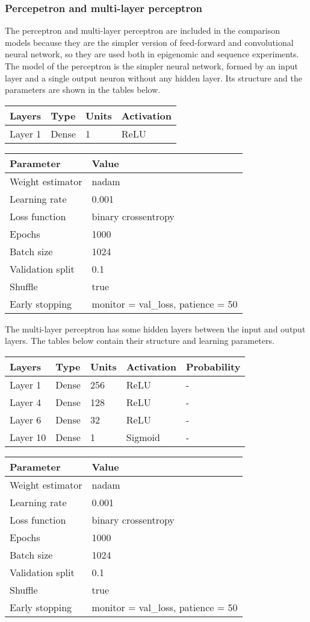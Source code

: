 \newpage
\subsubsection{Percepetron and multi-layer
perceptron}\label{header-n820}

The perceptron and multi-layer perceptron are included in the comparison
models because they are the simpler version of feed-forward and
convolutional neural network, so they are used both in epigenomic and
sequence experiments. The model of the perceptron is the simpler neural
network, formed by an input layer and a single output neuron without any
hidden layer. Its structure and the parameters are shown in the tables
below.

\begin{longtable}[]{@{}llll@{}}
\toprule
\textbf{Layers} & \textbf{Type} & \textbf{Units} & \textbf{Activation}\tabularnewline
\midrule
\endhead
Layer 1 & Dense & 1 & ReLU\tabularnewline
\bottomrule
\end{longtable}

\begin{longtable}[]{@{}ll@{}}
\toprule
\textbf{Parameter} & \textbf{Value}\tabularnewline
\midrule
\endhead
Weight estimator & nadam\tabularnewline
Learning rate & 0.001\tabularnewline
Loss function & binary crossentropy\tabularnewline
Epochs & 1000\tabularnewline
Batch size & 1024\tabularnewline
Validation split & 0.1\tabularnewline
Shuffle & true\tabularnewline
Early stopping & monitor = val\_loss, patience = 50\tabularnewline
\bottomrule
\end{longtable}

The multi-layer perceptron has some hidden layers between the input and
output layers. The tables below contain their structure and learning
parameters.

\begin{longtable}[]{@{}lllll@{}}
\toprule
\textbf{Layers} & \textbf{Type} & \textbf{Units} & \textbf{Activation} & \textbf{Probability}\tabularnewline
\midrule
\endhead
Layer 1 & Dense & 256 & ReLU & -\tabularnewline
Layer 4 & Dense & 128 & ReLU & -\tabularnewline
Layer 6 & Dense & 32 & ReLU & -\tabularnewline
Layer 10 & Dense & 1 & Sigmoid & -\tabularnewline
\bottomrule
\end{longtable}

\begin{longtable}[]{@{}ll@{}}
\toprule
\textbf{Parameter} & \textbf{Value}\tabularnewline
\midrule
\endhead
Weight estimator & nadam\tabularnewline
Learning rate & 0.001\tabularnewline
Loss function & binary crossentropy\tabularnewline
Epochs & 1000\tabularnewline
Batch size & 1024\tabularnewline
Validation split & 0.1\tabularnewline
Shuffle & true\tabularnewline
Early stopping & monitor = val\_loss, patience = 50\tabularnewline
\bottomrule
\end{longtable}